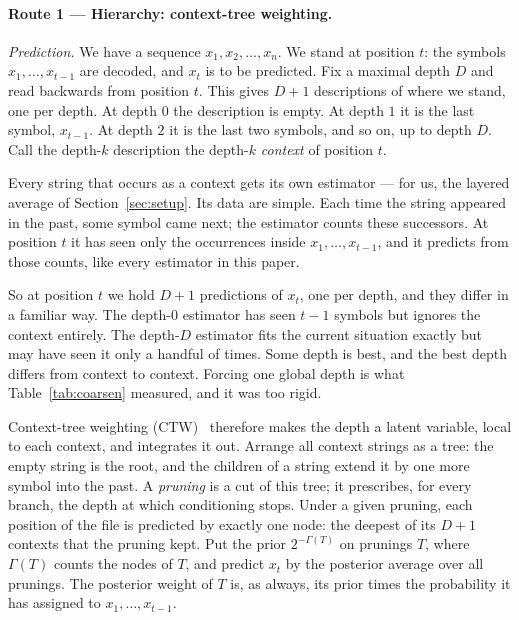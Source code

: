 \documentclass[11pt]{article}
\begin{document}
\paragraph{Route 1 --- Hierarchy: context-tree weighting.}

\emph{Prediction.}  We have a sequence $x_1, x_2, \dots, x_n$.  We
stand at position $t$: the symbols $x_1, \dots, x_{t-1}$ are decoded,
and $x_t$ is to be predicted.  Fix a maximal depth $D$ and read
backwards from position $t$.  This gives $D{+}1$ descriptions of
where we stand, one per depth.  At depth $0$ the description is
empty.  At depth $1$ it is the last symbol, $x_{t-1}$.  At depth $2$
it is the last two symbols, and so on, up to depth $D$.  Call the
depth-$k$ description the depth-$k$ \emph{context} of position $t$.

Every string that occurs as a context gets its own estimator --- for
us, the layered average of Section~\ref{sec:setup}.  Its data are
simple.  Each time the string appeared in the past, some symbol came
next; the estimator counts these successors.  At position $t$ it has
seen only the occurrences inside $x_1, \dots, x_{t-1}$, and it
predicts from those counts, like every estimator in this paper.

So at position $t$ we hold $D{+}1$ predictions of $x_t$, one per
depth, and they differ in a familiar way.  The depth-$0$ estimator
has seen $t{-}1$ symbols but ignores the context entirely.  The
depth-$D$ estimator fits the current situation exactly but may have
seen it only a handful of times.  Some depth is best, and the best
depth differs from context to context.  Forcing one global depth is
what Table~\ref{tab:coarsen} measured, and it was too rigid.

Context-tree weighting (CTW)~\cite{ctw95} therefore makes the depth a
latent variable, local to each context, and integrates it out.
Arrange all context strings as a tree: the empty string is the root,
and the children of a string extend it by one more symbol into the
past.  A \emph{pruning} is a cut of this tree; it prescribes, for
every branch, the depth at which conditioning stops.  Under a given
pruning, each position of the file is predicted by exactly one node:
the deepest of its $D{+}1$ contexts that the pruning kept.  Put the
prior $2^{-\Gamma(T)}$ on prunings $T$, where $\Gamma(T)$ counts the
nodes of $T$, and predict $x_t$ by the posterior average over all
prunings.  The posterior weight of $T$ is, as always, its prior times
the probability it has assigned to $x_1, \dots, x_{t-1}$.
\end{document}
